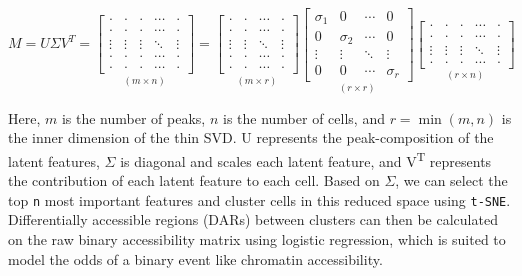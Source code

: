 \[
	M = U\Sigma V^T =
	\underset{(m \times n)}{\begin{bmatrix}
			\cdot  & \cdot  & \cdot  & \cdots & \cdot  \\
			\cdot  & \cdot  & \cdot  & \cdots & \cdot  \\
			\vdots & \vdots & \vdots & \ddots & \vdots \\
			\cdot  & \cdot  & \cdot  & \cdots & \cdot  \\
			\cdot  & \cdot  & \cdot  & \cdots & \cdot
		\end{bmatrix}}
	=
	\underset{(m \times r)}{\begin{bmatrix}
			\cdot  & \cdot  & \cdots & \cdot  \\
			\cdot  & \cdot  & \cdots & \cdot  \\
			\vdots & \vdots & \ddots & \vdots \\
			\cdot  & \cdot  & \cdots & \cdot  \\
			\cdot  & \cdot  & \cdots & \cdot
		\end{bmatrix}}
	\underset{(r \times r)}{\begin{bmatrix}
			\sigma_1 & 0        & \cdots & 0        \\
			0        & \sigma_2 & \cdots & 0        \\
			\vdots   & \vdots   & \ddots & \vdots   \\
			0        & 0        & \cdots & \sigma_r
		\end{bmatrix}}
	\underset{(r \times n)}{\begin{bmatrix}
			\cdot  & \cdot  & \cdot  & \cdots & \cdot  \\
			\cdot  & \cdot  & \cdot  & \cdots & \cdot  \\
			\vdots & \vdots & \vdots & \ddots & \vdots \\
			\cdot  & \cdot  & \cdot  & \cdots & \cdot
		\end{bmatrix}}
\]

Here, $m$ is the number of peaks, $n$ is the number of cells, and $r = \min(m,n)$ is the inner dimension of the thin SVD. U represents the peak-composition of the latent features, $\Sigma$ is diagonal and scales each latent feature, and V\textsuperscript{T} represents the contribution of each latent feature to each cell. Based on $\Sigma$, we can select the top \verb|n| most important features and cluster cells in this reduced space using \verb|t-SNE|. Differentially accessible regions (DARs) between clusters can then be calculated on the raw binary accessibility matrix using logistic regression, which is suited to model the odds of a binary event like chromatin accessibility.

